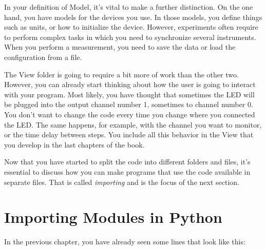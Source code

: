 
In your definition of Model, it's vital to make a further distinction. On the one hand, you have models for the devices you use. In those models, you define things such as units, or how to initialize the device. However, experiments often require to perform complex tasks in which you need to synchronize several instruments. When you perform a measurement, you need to save the data or load the configuration from a file.


The View folder is going to require a bit more of work than the other two. However, you can already start thinking about how the user is going to interact with your program. Most likely, you have thought that sometimes the {LED} will be plugged into the output channel number 1, sometimes to channel number 0. You don't want to change the code every time you change where you connected the LED. The same happens, for example, with the channel you want to monitor, or the time delay between steps. You include all this behavior in the View that you develop in the last chapters of the book.

Now that you have started to split the code into different folders and files, it's essential to discuss how you can make programs that use the code available in separate files. That is called \emph{importing} and is the focus of the next section.

\section{Importing Modules in Python}\label{sec:importing-python}
In the previous chapter, you have already seen some lines that look like this:

